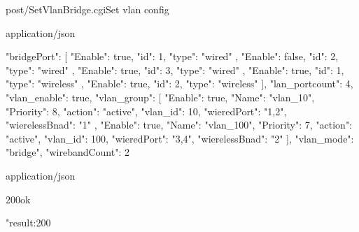 \documentclass[12pt,a4paper]{article}
\begin{document}
\begin{apiRoute}{post}{/SetVlanBridge.cgi}{Set vlan config}
	\begin{routeParameter}
	
	\end{routeParameter}
	\begin{routeRequest}{application/json}
		\begin{routeRequestBody}
{
  "bridgePort": [
    {
      "Enable": true,
      "id": 1,
      "type": "wired"
    },
    {
      "Enable": false,
      "id": 2,
      "type": "wired"
    },
    {
      "Enable": true,
      "id": 3,
      "type": "wired"
    },
    {
      "Enable": true,
      "id": 1,
      "type": "wireless"
    },
    {
      "Enable": true,
      "id": 2,
      "type": "wireless"
    }
  ],
  "lan_portcount": 4,
  "vlan_enable": true,
  "vlan_group": [
    {
      "Enable": true,
      "Name": "vlan_10",
      "Priority": 8,
      "action": "active",
      "vlan_id": 10,
      "wieredPort": "1,2",
      "wierelessBnad": "1"
    },
    {
      "Enable": true,
      "Name": "vlan_100",
      "Priority": 7,
      "action": "active",
      "vlan_id": 100,
      "wieredPort": "3,4",
      "wierelessBnad": "2"
    }
  ],
  "vlan_mode": "bridge",
  "wirebandCount": 2
}
		\end{routeRequestBody}
	\end{routeRequest}
	\begin{routeResponse}{application/json}
		\begin{routeResponseItem}{200}{ok}
			\begin{routeResponseItemBody}
{     
	"result:200
}
			\end{routeResponseItemBody}
		\end{routeResponseItem}
	\end{routeResponse}
\end{apiRoute}
\end{document}
